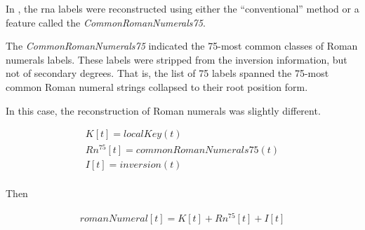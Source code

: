 
In \textcite{napoleslopez2021augmentednet}, the \gls{rna}
labels were reconstructed using either the ``conventional''
method or a feature called the \emph{CommonRomanNumerals75}.

The \emph{CommonRomanNumerals75} indicated the 75-most
common classes of Roman numerals labels. These labels were
stripped from the inversion information, but not of
secondary degrees. That is, the list of 75 labels spanned
the 75-most common Roman numeral strings collapsed to their
root position form.

In this case, the reconstruction of Roman numerals was
slightly different.

\begin{equation}
\begin{split}
K[t] = localKey(t) \\
Rn^{75}[t] = commonRomanNumerals75(t) \\
I[t] = inversion(t)  \\
\end{split}
\end{equation}

Then 

\begin{equation}
\begin{split}
romanNumeral[t] = K[t] + Rn^{75}[t] + I[t]
\end{split}
\end{equation}
